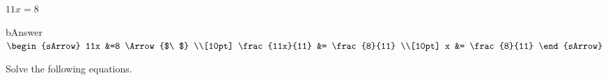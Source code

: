 \begin{mtask}
    \task[] $11x = 8 $
              \begin{envOut}[equal height group=A-Rev-1]{bAnswer}
			       $\begin{sArrow}
			             11x &=8                     \Arrow{$\ $} \\[10pt]
                          &=            \\[10pt]      
					     x &=    
	                \end{sArrow}$
              \end{envOut}
\end{mtask}


\clearpage\noindent%
Solve the following equations.
